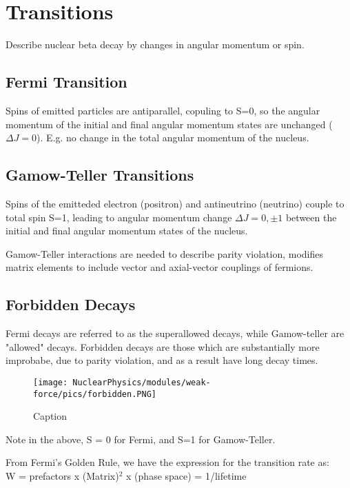             
        
        \section{Transitions}
            Describe nuclear beta decay by changes in angular momentum or spin. 
            \subsection{Fermi Transition}
                Spins of emitted particles are antiparallel, copuling to S=0, so the angular momentum of the initial and final angular momentum states are unchanged ($\Delta J = 0$). E.g. no change in the total angular momentum of the nucleus. 
            \subsection{Gamow-Teller Transitions}
                Spins of the emitteded electron (positron) and antineutrino (neutrino) couple to total spin S=1, leading to angular momentum change $\Delta J = 0, \pm1$ between the initial and final angular momentum states of the nucleus.
                
                Gamow-Teller interactions are needed to describe parity violation, modifies matrix elements to include vector and axial-vector couplings of fermions. 
                
            \subsection{Forbidden Decays}
                Fermi decays are referred to as the superallowed decays, while Gamow-teller are "allowed" decays. Forbidden decays are those which are substantially more improbabe, due to parity violation, and as a result have long decay times. 
                
            \begin{figure}[H]
                \centering
                \texttt{[image: NuclearPhysics/modules/weak-force/pics/forbidden.PNG]}
            \caption{Caption}
            \end{figure}
            
            
                Note in the above, S = 0 for Fermi, and S=1 for Gamow-Teller. 
        
                From Fermi's Golden Rule, we have the expression for the transition rate as:\\
                W = prefactors x (Matrix)$^2$ x (phase space) = 1/lifetime \\
                \newline
                

